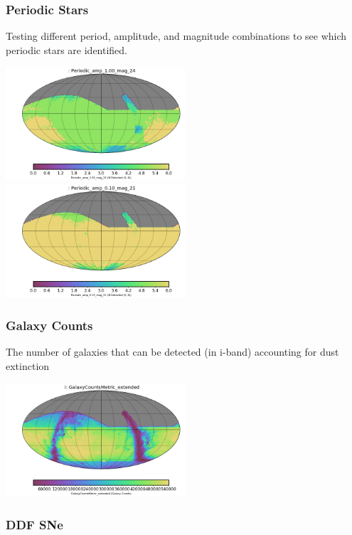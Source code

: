 {\subsubsection{Periodic Stars}

Testing different period, amplitude, and magnitude combinations to see which periodic stars are identified.

\includegraphics[width=0.5\textwidth]{metric_summary/sci_baseline_v1.4_10yrs/thumb._Periodic_amp_1_00_mag_24_HEAL_SkyMap.png}
\includegraphics[width=0.5\textwidth]{metric_summary/sci_baseline_v1.4_10yrs/thumb._Periodic_amp_0_10_mag_21_HEAL_SkyMap.png}

\subsubsection{Galaxy Counts}

The number of galaxies that can be detected (in i-band) accounting for dust extinction

\includegraphics[width=0.5\textwidth]{metric_summary/sci_baseline_v1.4_10yrs/thumb._GalaxyCountsMetric_extended_i_HEAL_SkyMap.png}

\subsubsection{DDF SNe}

}
